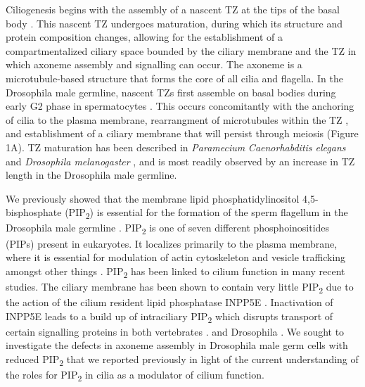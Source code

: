 \documentclass[12pt, twoside, letterpaper]{article}
\newcommand{\PIP}{PIP\textsubscript{2}}
\begin{document}
\begin{doublespacing}
\begin{linenumbers}
    Ciliogenesis begins with the assembly of a nascent TZ at the tips of
    the basal body \citep{reiter2012base}.
    This nascent TZ undergoes maturation, during which its structure and protein
    composition changes, allowing for the
    establishment of a compartmentalized ciliary space bounded by the ciliary membrane
    and the TZ in which axoneme assembly and signalling can occur.
    The axoneme is a microtubule-based structure that forms the core of all cilia and flagella.
    In the Drosophila male germline, nascent TZs first assemble on basal bodies
    during early G2 phase in spermatocytes \citep{riparbelli2012assembly}.
    This occurs concomitantly with the anchoring of cilia to the plasma membrane,
    rearrangment of microtubules within the TZ \citep{gottardo2013cilium},
    and establishment of a
    ciliary membrane that will persist through meiosis
    \citep{riparbelli2012assembly} (Figure 1A).
    TZ maturation has been described in
    \textit{Paramecium} \citep{aubusson2015transition}
    \textit{Caenorhabditis elegans} \citep{serwas2017centrioles} and
    \textit{Drosophila melanogaster} \citep{gottardo2013cilium},
    and is most readily observed by an increase in TZ length
    in the Drosophila male germline.

    We previously showed that the membrane lipid phosphatidylinositol 4,5-bisphosphate
    (\PIP{}) is essential for the formation of the sperm flagellum in the Drosophila
    male germline \citep{wei2008depletion, fabian2010phosphatidylinositol}.
    \PIP{} is one of seven different phosphoinositides (PIPs) present in eukaryotes.
    It localizes primarily to the plasma membrane, where it is essential for
    modulation of actin cytoskeleton and vesicle trafficking amongst other things
    \citep{balla2013phosphoinositides}.
    \PIP{} has been linked to cilium function in many recent studies.
    The ciliary membrane has been shown to contain very little \PIP{} due to the action
    of the cilium resident lipid phosphatase INPP5E \citep{nakatsu2015phosphoinositide}.
    Inactivation of INPP5E leads to a build up of intraciliary \PIP{}
    which disrupts transport of certain signalling proteins in both vertebrates
    \citep{chavez2015modulation, garcia2015phosphoinositides, conduit2017compartmentalized}.
    and Drosophila \citep{park2015ciliary}.
    We sought to investigate the defects in axoneme assembly in Drosophila male germ cells
    with reduced \PIP{} 
    that we reported previously in light of the current understanding of the roles
    for \PIP{} in cilia as a modulator of cilium function.


\end{linenumbers}
\end{doublespacing}
\end{document}
